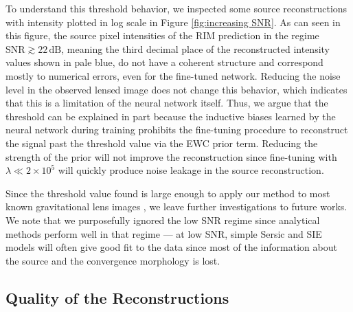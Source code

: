 To understand this threshold behavior, 
we inspected some source reconstructions with intensity plotted in log scale 
in Figure \ref{fig:increasing SNR}. As can seen in this figure, the source pixel intensities of the 
RIM prediction in the regime $\mathrm{SNR} \gtrsim 22\,\mathrm{dB}$, meaning the third decimal place of the reconstructed 
intensity values shown in pale blue, do not have a coherent structure and 
correspond mostly to numerical errors, even for the fine-tuned network. Reducing the noise 
level in the observed lensed image does not change this behavior, which indicates that this is a limitation 
of the neural network itself. Thus, we argue that the threshold can be explained in part because 
the inductive biases learned by the neural network during training prohibits the fine-tuning 
procedure to reconstruct the signal past the threshold value via the EWC prior term. Reducing the 
strength of the prior will not improve the reconstruction since fine-tuning with
$\lambda \ll 2\times 10^5$ will quickly produce noise leakage in the source reconstruction.

Since the threshold value found is large enough to apply our method to most known 
gravitational lens images \citep{Bolton2008,Shu2017},
we leave further investigations to future works.
We note that we purposefully ignored the 
low SNR regime since analytical methods perform well in that regime --- at low SNR, simple 
Sersic \citep{Sersic1963} and SIE \citep[]{keeton2001} models will often give good fit to the data 
since most of the information about the source and the convergence morphology is lost.





\subsection{Quality of the Reconstructions}\label{sec:quality of reconstructions}


